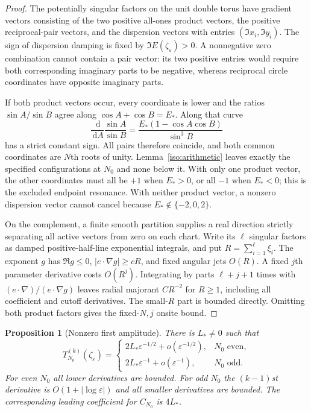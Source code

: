 \documentclass[11pt]{article}
\numberwithin{equation}{section}
\newtheorem{proposition}[theorem]{Proposition}
\theoremstyle{definition}
\newcommand{\dd}{\,\mathrm d}
\newcommand{\eps}{\varepsilon}
\begin{document}
\begin{proof}
The potentially singular factors on the unit double torus have gradient
vectors consisting of the two positive all-ones product vectors, the
positive reciprocal-pair vectors, and the dispersion vectors with entries
$(\Im x_i,\Im y_i)$. The sign of dispersion damping is fixed by
$\Im E(\zeta_\eps)>0$. A nonnegative zero combination cannot contain
a pair vector: its two positive entries would require both corresponding
imaginary parts to be negative, whereas reciprocal circle coordinates
have opposite imaginary parts.

If both product vectors occur, every coordinate is lower and the ratios
$\sin A/\sin B$ agree along $\cos A+\cos B=E_*$. Along that curve
\[
 \frac{\dd}{\dd A}\frac{\sin A}{\sin B}
 =\frac{E_*(1-\cos A\cos B)}{\sin^3B}
\]
has a strict constant sign. All pairs therefore coincide, and both common
coordinates are $N$th roots of unity. Lemma~\ref{iso:arithmetic} leaves
exactly the specified configurations at $N_0$ and none below it.
With only one product vector, the other coordinates must all be $+1$
when $E_*>0$, or all $-1$ when $E_*<0$; this is the excluded endpoint
resonance. With neither product vector, a nonzero dispersion vector cannot
cancel because $E_*\notin\{-2,0,2\}$.

On the complement, a finite smooth partition supplies a real direction
strictly separating all active vectors from zero on each chart. Write
its $\ell$ singular factors as damped positive-half-line exponential
integrals, and put $R=\sum_{i=1}^\ell\xi_i$. The exponent $g$ has
$\Re g\le0$, $|e\cdot\nabla g|\ge cR$, and fixed angular jets
$O(R)$. A fixed $j$th parameter derivative costs $O(R^j)$.
Integrating by parts $\ell+j+1$ times with
$(e\cdot\nabla)/(e\cdot\nabla g)$ leaves radial majorant $CR^{-2}$
for $R\ge1$, including all coefficient and cutoff derivatives. The
small-$R$ part is bounded directly. Omitting both product factors
gives the fixed-\(N,j\) onsite bound.
\end{proof}

\begin{proposition}[Nonzero first amplitude]\label{iso:first}
There is $L_*\ne0$ such that
\[
 T_{N_0}^{(k)}(\zeta_\eps)=
 \begin{cases}
 2L_*\eps^{-1/2}+o(\eps^{-1/2}),&N_0\text{ even},\\
 2L_*\eps^{-1}+o(\eps^{-1}),&N_0\text{ odd}.
 \end{cases}
\]
For even $N_0$ all lower derivatives are bounded. For odd $N_0$ the
$(k-1)$st derivative is $O(1+|\log\eps|)$ and all smaller derivatives
are bounded. The corresponding leading coefficient for $C_{N_0}$ is
$4L_*$.
\end{proposition}
\end{document}
